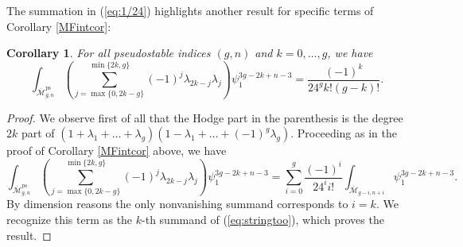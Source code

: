 \documentclass[leqno,12pt]{amsart}
\newtheorem{corollary}[theorem]{Corollary}
\theoremstyle{remark}
\newtheorem{remark}[theorem]{Remark}
\numberwithin{equation}{section}
\DeclareMathOperator{\ps}{ps}
\begin{document}
The summation in (\ref{eq:1/24}) highlights another result for specific terms of Corollary \ref{MFintcor}:

\begin{corollary}\label{Cor:Cor}
    For all pseudostable indices $(g, n)$ and $k = 0, \dots, g$, we have $$\int_{\overline{\mathcal{M}}^{\ps}_{g, n}}\left(\sum_{j = \max\{0, 2k-g\}}^{\min\{2k, g\}}(-1)^j\lambda_{2k-j}\lambda_j\right)\psi_1^{3g-2k+n-3} = \frac{(-1)^k}{24^g k!(g-k)!}.$$
\end{corollary}
\begin{proof}
We observe first of all that the Hodge part in the parenthesis is the degree $2k$ part of $(1 + \lambda_1 + \dots + \lambda_g)(1 - \lambda_1 + \dots + (-1)^g\lambda_g)$. Proceeding as in the proof of Corollary \ref{MFintcor} above,
we have
\begin{equation}
   \int_{\overline{\mathcal{M}}^{\ps}_{g, n}}\left(\sum_{j = \max\{0, 2k-g\}}^{\min\{2k, g\}}(-1)^j\lambda_{2k-j}\lambda_j\right)\psi_1^{3g-2k+n-3} = \sum_{i=0}^g\frac{(-1)^i}{24^ii!}\int_{\overline{\mathcal{M}}_{g-i, n+i}}\psi_1^{3g-2k+n-3}.  
\end{equation}
 By dimension reasons the only nonvanishing summand corresponds to $i=k$. We recognize this term as  the $k$-th summand of  
 (\ref{eq:stringtoo}), which proves the result.
\end{proof}

\end{document}
